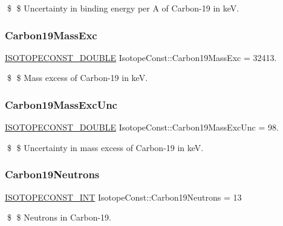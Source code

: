 \$ \$ Uncertainty in binding energy per A of Carbon-\/19 in keV. \mbox{\label{group___isotope_const-_carbon-_c19_ga633d4ab889ddfa376065d0b23935226a}} 
\subsubsection{\texorpdfstring{Carbon19\+Mass\+Exc}{Carbon19MassExc}}
{\footnotesize\ttfamily \mbox{\hyperlink{group___isotope_const-_macros_ga8f45a7272ce02c0b4c65c44636ed719a}{I\+S\+O\+T\+O\+P\+E\+C\+O\+N\+S\+T\+\_\+\+D\+O\+U\+B\+LE}} Isotope\+Const\+::\+Carbon19\+Mass\+Exc = 32413.}

\$ \$ Mass excess of Carbon-\/19 in keV. \mbox{\label{group___isotope_const-_carbon-_c19_ga6f4ee86921a299a7f2e05f16b7e83f37}} 
\subsubsection{\texorpdfstring{Carbon19\+Mass\+Exc\+Unc}{Carbon19MassExcUnc}}
{\footnotesize\ttfamily \mbox{\hyperlink{group___isotope_const-_macros_ga8f45a7272ce02c0b4c65c44636ed719a}{I\+S\+O\+T\+O\+P\+E\+C\+O\+N\+S\+T\+\_\+\+D\+O\+U\+B\+LE}} Isotope\+Const\+::\+Carbon19\+Mass\+Exc\+Unc = 98.}

\$ \$ Uncertainty in mass excess of Carbon-\/19 in keV. \mbox{\label{group___isotope_const-_carbon-_c19_gacddc54dffd5487fb154ae6012685949b}} 
\subsubsection{\texorpdfstring{Carbon19\+Neutrons}{Carbon19Neutrons}}
{\footnotesize\ttfamily \mbox{\hyperlink{group___isotope_const-_macros_ga5f18360b3e99483a35c32d789e62621c}{I\+S\+O\+T\+O\+P\+E\+C\+O\+N\+S\+T\+\_\+\+I\+NT}} Isotope\+Const\+::\+Carbon19\+Neutrons = 13}

\$ \$ Neutrons in Carbon-\/19. \mbox{\label{group___isotope_const-_carbon-_c19_gaca7954d836a3edc61cf1f2c8a9098dfb}} 
